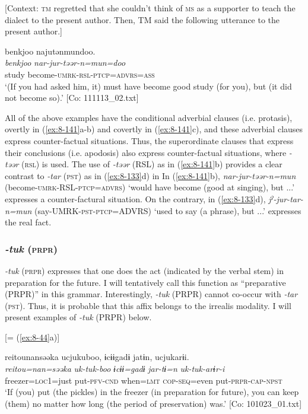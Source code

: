 \ex {}[Context: \textsc{tm} regretted that she couldn’t think of \textsc{ms} as a supporter to teach the dialect to the present author. Then, TM said the following utterance to the present author.]

{\TM}
\glll  {\textbar}benkjoo{\textbar}  najutənmundoo.\\
\textit{benkjoo}  \textit{nar-jur-təər-n=mun=doo}\\
study  become-\textsc{umrk}-\textsc{rsl}-\textsc{ptcp}=\textsc{advrs}=\textsc{ass}\\
\glt ‘(If you had asked him, it) must have become good study (for you), but (it did not become so).’ [Co: 111113\_02.txt]
\z
\z

All of the above examples have the conditional adverbial clauses (i.e. protasis), overtly in (\ref{ex:8-141}a-b) and covertly in (\ref{ex:8-141}c), and these adverbial clauses express counter-factual situations. Thus, the superordinate clauses that express their conclusions (i.e. apodosis) also express counter-factual situations, where \textit{-təər} (\textsc{rsl}) is used. The use of \textit{-təər} (RSL) as in (\ref{ex:8-141}b) provides a clear contrast to \textit{-tar} (\textsc{pst}) as in (\ref{ex:8-133}d) in  In (\ref{ex:8-141}b), \textit{nar-jur-təər-n=mun} (become-\textsc{umrk}-RSL-\textsc{ptcp}=\textsc{advrs}) ‘would have become (good at singing), but ...’ expresses a counter-factural situation. On the contrary, in (\ref{ex:8-133}d), \textit{jˀ-jur-tar-n=mun} (say-UMRK-\textsc{pst}-\textsc{ptcp}=ADVRS) ‘used to say (a phrase), but ...’ expresses the real fact.

\subsubsection{\textit{-tuk} (\textsc{prpr})}

\textit{-tuk} (\textsc{prpr}) expresses that one does the act (indicated by the verbal stem) in preparation for the future. I will tentatively call this function as “preparative (PRPR)” in this grammar. Interestingly, \textit{-tuk} (PRPR) cannot co-occur with \textit{-tar} (\textsc{pst}). Thus, it is probable that this affix belongs to the irrealis modality. I will present examples of \textit{-tuk} (PRPR) below.

\ea\label{ex:8-142}
\ea {}[= (\ref{ex:8-44}a)]

{\TM}
\glll  {\textbar}reitou{\textbar}nansəəka  ucjukuboo,  ɨcɨɨgadɨ  jatɨn,      ucjukarɨi.\\
\textit{reitou=nan=səəka}  \textit{uk-tuk-boo}  \textit{ɨcɨɨ=gadɨ}  \textit{jar-tɨ=n}      \textit{uk-tuk-arɨr-i}
\\
freezer=\textsc{loc1}=just  put-\textsc{pfv}-\textsc{cnd}  when=\textsc{lmt}  \textsc{cop}-\textsc{seq}=even  put-\textsc{prpr}-\textsc{cap}-\textsc{npst}\\
\glt ‘If (you) put (the pickles) in the freezer (in preparation for future), you can keep (them) no matter how long (the period of preservation) was.’ [Co: 101023\_01.txt]

